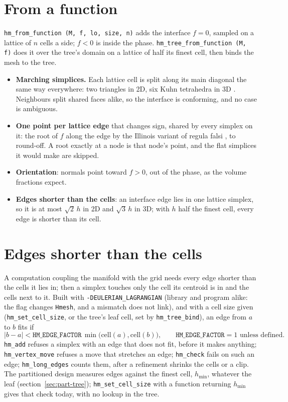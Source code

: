 \documentclass[10pt,a4paper]{article}
\theoremstyle{definition}
\newcommand{\fn}[1]{\texttt{#1}}
\begin{document}
\section{From a function}
\label{sec:implicit}

\fn{hm\_from\_function (M, f, lo, size, n)} adds the interface $f = 0$,
sampled on a lattice of $n$ cells a side; $f < 0$ is inside the phase.
\fn{hm\_tree\_from\_function (M, f)} does it over the tree's domain on a
lattice of half its finest cell, then binds the mesh to the tree.

\begin{itemize}
  \item \textbf{Marching simplices.} Each lattice cell is split along its
    main diagonal the same way everywhere: two triangles in 2D, six Kuhn
    tetrahedra in 3D \cite{kuhn}. Neighbours split shared faces alike, so
    the interface is conforming, and no case is ambiguous.
  \item \textbf{One point per lattice edge} that changes sign, shared by
    every simplex on it: the root of $f$ along the edge by the Illinois
    variant of regula falsi \cite{illinois}, to round-off. A root exactly at
    a node is that node's point, and the flat simplices it would make are
    skipped.
  \item \textbf{Orientation}: normals point toward $f > 0$, out of the
    phase, as the volume fractions expect.
  \item \textbf{Edges shorter than the cells}: an interface edge lies in one
    lattice simplex, so it is at most $\sqrt{2}\,h$ in 2D and $\sqrt{3}\,h$
    in 3D; with $h$ half the finest cell, every edge is shorter than its
    cell.
\end{itemize}

\section{Edges shorter than the cells}
\label{sec:el}

A computation coupling the manifold with the grid needs every edge shorter
than the cells it lies in; then a simplex touches only the cell its
centroid is in and the cells next to it. Built with
\fn{-DEULERIAN\_LAGRANGIAN} (library and program alike: the flag changes
\fn{Hmesh}, and a mismatch does not link), and with a cell size given
(\fn{hm\_set\_cell\_size}, or the tree's leaf cell, set by
\fn{hm\_tree\_bind}), an edge from $a$ to $b$ fits if
\[
  |b - a| < \fn{HM\_EDGE\_FACTOR} \, \min \big( \mathrm{cell}(a),
    \mathrm{cell}(b) \big), \qquad \fn{HM\_EDGE\_FACTOR} = 1 \text{ unless
    defined}.
\]
\fn{hm\_add} refuses a simplex with an edge that does not fit, before it
makes anything; \fn{hm\_vertex\_move} refuses a move that stretches an edge;
\fn{hm\_check} fails on such an edge; \fn{hm\_long\_edges} counts them, after
a refinement shrinks the cells or a clip. The partitioned design measures
edges against the finest cell, $h_{\min}$, whatever the leaf
(section~\ref{sec:part-tree}); \fn{hm\_set\_cell\_size} with a function
returning $h_{\min}$ gives that check today, with no lookup in the tree.
\end{document}
